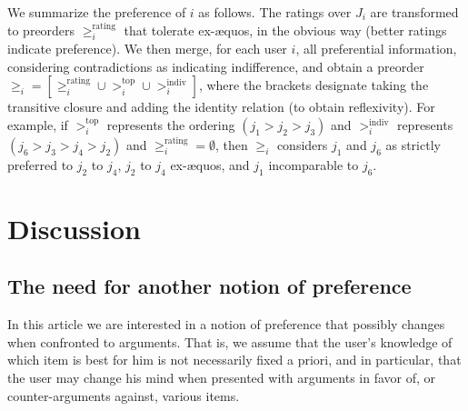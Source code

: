 \documentclass[french, english]{da2pl2018}
\begin{document}
We summarize the preference of $i$ as follows. The ratings over $J_i$ are transformed to preorders $≥^\text{rating}_i$ that tolerate ex-æquos, in the obvious way (better ratings indicate preference). We then merge, for each user $i$, all preferential information, considering contradictions as indicating indifference, and obtain a preorder $≥_i = [≥^\text{rating}_i ∪ >^\text{top}_i ∪ >^\text{indiv}_i]$, where the brackets designate taking the transitive closure and adding the identity relation (to obtain reflexivity). For example, if $>^\text{top}_i$ represents the ordering $(j_1 > j_2 > j_3)$ and $>^\text{indiv}_i$ represents $(j_6 > j_3 > j_4 > j_2)$ and $≥^\text{rating}_i = \emptyset$, then $≥_i$ considers $j_1$ and $j_6$ as strictly preferred to $j_2$ to $j_4$, $j_2$ to $j_4$ ex-æquos, and $j_1$ incomparable to $j_6$.

\section{Discussion}
\subsection{The need for another notion of preference}
In this article we are interested in a notion of preference that possibly changes when confronted to arguments. That is, we assume that the user’s knowledge of which item is best for him is not necessarily fixed a priori, and in particular, that the user may change his mind when presented with arguments in favor of, or counter-arguments against, various items. 
\end{document}
